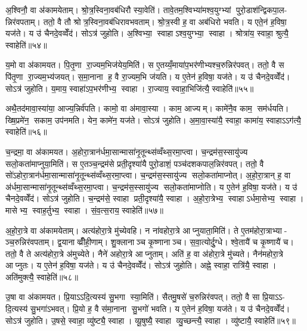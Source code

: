 अ॒श्विनौ॒ वा अ॑कामयेताम्। श्रो॒त्र॒स्विना॒वब॑धिरौ स्या॒वेति॑। तावे॒तम॒श्विभ्या॑मश्व॒युग्भ्यां पुरो॒डाश॑न्द्विकपा॒ल- न्निर॑वपताम्। ततो॒ वै तौ श्रोत्र॒स्विना॒वब॑धिरावभवताम्। श्रो॒त्र॒स्वी ह॒ वा अब॑धिरो भवति। य एते॒न॑ ह॒विषा॒ यज॑ते। य उ॑ चैनदे॒वव्वेँद॑। सोऽत्र॑ जुहोति। अ॒श्विभ्या॒ स्वाहाऽश्व॒युग्भ्या॒ स्वाहा। श्रोत्रा॑य॒ स्वाहा॒ श्रुत्यै॒ स्वाहेति॑॥५४॥

य॒मो वा अ॑कामयत। पि॒तृ॒णा रा॒ज्यम॒भिज॑येय॒मिति॑। स ए॒तय्यँ॒माया॑प॒भर॑णीभ्यश्च॒रुन्निर॑पवत्। ततो॒ वै स पि॑तृ॒णा रा॒ज्यम॒भ्य॑जयत्। स॒मा॒नाना ह॒ वै रा॒ज्यम॒भि ज॑यति। य ए॒तेन॑ ह॒विषा॒ यज॑ते। य उ॑ चैनदे॒वव्वेँद॑। सोऽत्र॑ जुहोति। य॒माय॒ स्वाहा॑ऽप॒भर॑णीभ्य॒ स्वाहा। रा॒ज्याय॒ स्वाहा॒भिजि॑त्यै॒ स्वाहेति॑॥५५॥

अथै॒तद॑मावा॒स्या॑या॒ आज्य॒न्निर्व॑पति। कामो॒ वा अ॑मावा॒स्या। काम॒ आज्यम्। कामे॑नै॒व काम॒ सम॑र्धयति। ख्षि॒प्रमे॑न॒ सकाम॒ उप॑नमति। येन॒ कामे॑न॒ यज॑ते। सोऽत्र॑ जुहोति। अ॒मा॒वा॒स्या॑यै॒ स्वाहा॒ कामा॑य॒ स्वाहाऽऽग॑त्यै॒ स्वाहेति॑॥५६॥\anuvakamend[मि॒त्र इन्द्र॑ प्र॒जाप॑ति॒र्दश॑ द॒शाप॒ एका॑दश॒ विश्वे॒ ब्रह्म॒ दश॑दश॒ विष्णु॒स्त्रयो॑दश॒ वस॑व॒ इन्द्रो॒ऽजोऽहि॒र्वै बु॒ध्निय॑ पू॒षाऽश्विनौ॑ य॒मो दश॑ द॒शाथै॒तद॑मावा॒स्या॑या अ॒ष्टौ पञ्च॑दश]

च॒न्द्रमा॒ वा अ॑कामयत। अ॒होरा॒त्रान॑र्धमा॒सान्मासा॑नृ॒तून्थ्स॑व्वँथ्स॒रमा॒प्त्वा। च॒न्द्रम॑स॒स्सायु॑ज्य सलो॒कता॑माप्नुया॒मिति॑। स ए॒तञ्च॒न्द्रम॑से प्रती॒दृश्या॑यै पुरो॒डाशं॒ पञ्च॑दशकपाल॒न्निर॑वपत्। ततो॒ वै सो॑ऽहोरा॒त्रान॑र्धमा॒सान्मासा॑नृ॒तून्थ्स॑व्वँथ्स॒रमा॒प्त्वा। च॒न्द्रम॑स॒स्सायु॑ज्य सलो॒कता॑माप्नोत्। अ॒हो॒रा॒त्रान् ह॒ वा अ॑र्धमा॒सान्मासा॑नृ॒तून्थ्स॑व्वँथ्स॒रमा॒प्त्वा। च॒न्द्रम॑स॒स्सायु॑ज्य सलो॒कता॑माप्नोति। य ए॒तेन॑ ह॒विषा॒ यज॑ते। य उ॑ चैनदे॒वव्वेँद॑। सोऽत्र॑ जुहोति। च॒न्द्रम॑से॒ स्वाहा प्रती॒दृश्या॑यै॒ स्वाहा। अ॒हो॒रा॒त्रेभ्य॒ स्वाहाऽर्धमा॒सेभ्य॒ स्वाहा। मासेभ्य॒ स्वाह॒र्तुभ्य॒ स्वाहा। सं॒व॒त्स॒राय॒ स्वाहेति॑॥५७॥

अ॒हो॒रा॒त्रे वा अ॑कामयेताम्। अत्य॑होरा॒त्रे मु॑च्येवहि। न ना॑वहोरा॒त्रे आप्नुयाता॒मिति॑। ते ए॒तम॑होरा॒त्राभ्या- ञ्च॒रुन्निर॑वपताम्। द्व॒यानाव्व्रीँही॒णाम्। शु॒क्लानाञ्च कृ॒ष्णानाञ्च। स॒वा॒त्योर्दु॒ग्धे। श्वे॒तायै॑ च कृ॒ष्णायै॑ च। ततो॒ वै ते अत्य॑होरा॒त्रे अ॑मुच्येते। नैने॑ अहोरा॒त्रे आप्नुताम्। अति॑ ह॒ वा अ॑होरा॒त्रे मु॑च्यते। नैन॑महोरा॒त्रे आप्नुतः। य ए॒तेन॑ ह॒विषा॒ यज॑ते। य उ॑ चैनदे॒वव्वेँद॑। सोऽत्र॑ जुहोति। अह्ने॒ स्वाहा॒ रात्रि॑यै॒ स्वाहा। अति॑मुक्त्यै॒ स्वाहेति॑॥५८॥

उ॒षा वा अ॑कामयत। प्रि॒याऽऽदि॒त्यस्य॑ सु॒भगा स्या॒मिति॑। सैतमु॒षसे॑ च॒रुन्निर॑वपत्। ततो॒ वै सा प्रि॒याऽऽ- दि॒त्यस्य॑ सु॒भगा॑ऽभवत्। प्रि॒यो ह॒ वै स॑मा॒नाना सु॒भगो॑ भवति। य ए॒तेन॑ ह॒विषा॒ यज॑ते। य उ॑ चैनदे॒वव्वेँद॑। सोऽत्र॑ जुहोति। उ॒षसे॒ स्वाहा॒ व्यु॑ष्ट्यै॒ स्वाहा। व्यू॒षुष्यै॒ स्वाहा व्यु॒च्छन्त्यै॒ स्वाहा। व्यु॑ष्टायै॒ स्वाहेति॑॥५९॥

